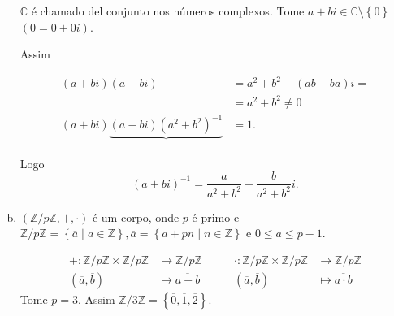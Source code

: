 \begin{example}
\begin{enumerate}[a)]
		      $\mathbb{C}$ é chamado del conjunto nos números complexos.
		      Tome $a+bi\in\mathbb{C}\setminus\left\{0\right\}$
		      $(0=0+0i)$.

		      Assim

		      \begin{align*}
			      \left(a+bi\right)\left(a-bi\right)
			       & =a^{2}+b^{2}+\left(ab-ba\right)i= \\
			       & =a^{2}+b^{2} \neq 0               \\
			      \left(a+bi\right)
			      \underbrace{
				      \left(a-bi\right)
				      {\left(a^{2}+b^{2}\right)}^{-1}
			      }_{}
			       & =1.
		      \end{align*}

		      Logo
		      \[
			      {\left(a+bi\right)}^{-1}=
			      \frac{a}{a^{2}+b^{2}}-
			      \frac{b}{a^{2}+b^{2}}i.
		      \]

		\item

		      $\left(\mathbb{Z}/p\mathbb{Z},+,\cdot\right)$ é um corpo,
		      onde $p$ é primo e
		      \begin{math}
			      \mathbb{Z}/p\mathbb{Z}=
			      \left\{
			      \overline{a}\mid a\in\mathbb{Z}
			      \right\},
			      \overline{a}=
			      \left\{
			      a+pn\mid n\in\mathbb{Z}
			      \right\}
		      \end{math}
		      e $0\leq a\leq p-1$.

		      \[
			      \begin{aligned}
				      +\colon\mathbb{Z}/p\mathbb{Z}\times\mathbb{Z}/p\mathbb{Z} & \longrightarrow\mathbb{Z}/p\mathbb{Z} \\
				      \left(\overline{a},\overline{b}\right)                    & \longmapsto
				      \overline{a+b}
			      \end{aligned}\qquad
			      \begin{aligned}
				      \cdot\colon\mathbb{Z}/p\mathbb{Z}\times\mathbb{Z}/p\mathbb{Z} & \longrightarrow\mathbb{Z}/p\mathbb{Z} \\
				      \left(\overline{a},\overline{b}\right)                        & \longmapsto
				      \overline{a\cdot b}
			      \end{aligned}
		      \]
		      Tome $p=3$.
		      Assim
		      \begin{math}
			      \mathbb{Z}/3\mathbb{Z}=
			      \left\{
			      \overline{0},
			      \overline{1},
			      \overline{2}
			      \right\}
		      \end{math}.


\end{enumerate}
\end{example}
